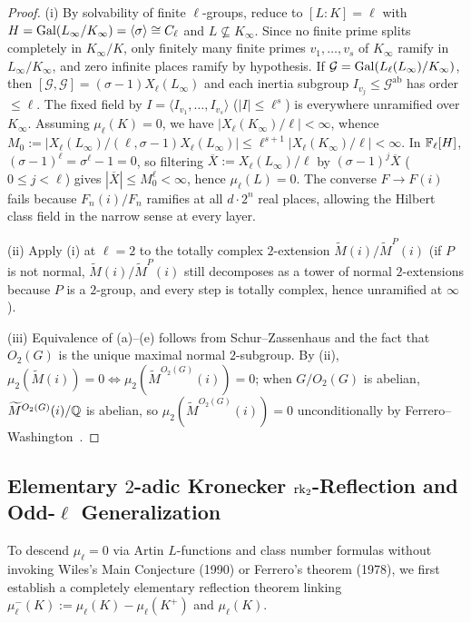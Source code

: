 \begin{proof}
(i) By solvability of finite $\ell$-groups, reduce to $[L:K] = \ell$ with $H = \mathrm{Gal}(L_\infty/K_\infty) = \langle \sigma \rangle \cong C_\ell$ and $L \not\subseteq K_\infty$. Since no finite prime splits completely in $K_\infty/K$, only finitely many finite primes $v_1, \dots, v_s$ of $K_\infty$ ramify in $L_\infty/K_\infty$, and zero infinite places ramify by hypothesis. If $\mathcal{G} = \mathrm{Gal}(L_\ell(L_\infty)/K_\infty)$, then $[\mathcal{G},\mathcal{G}] = (\sigma-1)X_\ell(L_\infty)$ and each inertia subgroup $I_{v_j} \le \mathcal{G}^{\mathrm{ab}}$ has order $\le \ell$. The fixed field by $I = \langle I_{v_1}, \dots, I_{v_s} \rangle$ ($|I| \le \ell^s$) is everywhere unramified over $K_\infty$. Assuming $\mu_\ell(K) = 0$, we have $|X_\ell(K_\infty)/\ell| < \infty$, whence $M_0 := |X_\ell(L_\infty)/(\ell, \sigma-1)X_\ell(L_\infty)| \le \ell^{s+1}|X_\ell(K_\infty)/\ell| < \infty$. In $\mathbb{F}_\ell[H]$, $(\sigma-1)^\ell = \sigma^\ell - 1 = 0$, so filtering $\overline{X} := X_\ell(L_\infty)/\ell$ by $(\sigma-1)^j\overline{X}$ ($0 \le j < \ell$) gives $|\overline{X}| \le M_0^\ell < \infty$, hence $\mu_\ell(L) = 0$. The converse $F \to F(i)$ fails because $F_n(i)/F_n$ ramifies at all $d\cdot 2^n$ real places, allowing the Hilbert class field in the narrow sense at every layer.

(ii) Apply (i) at $\ell = 2$ to the totally complex $2$-extension $\widetilde{M}(i)/\widetilde{M}^P(i)$ (if $P$ is not normal, $\widetilde{M}(i)/\widetilde{M}^P(i)$ still decomposes as a tower of normal $2$-extensions because $P$ is a $2$-group, and every step is totally complex, hence unramified at $\infty$).

(iii) Equivalence of (a)--(e) follows from Schur--Zassenhaus and the fact that $O_2(G)$ is the unique maximal normal $2$-subgroup. By (ii), $\mu_2(\widetilde{M}(i)) = 0 \iff \mu_2(\widetilde{M}^{O_2(G)}(i)) = 0$; when $G/O_2(G)$ is abelian, $\widetilde{M}^{O_2(G)}(i)/\mathbb{Q}$ is abelian, so $\mu_2(\widetilde{M}^{O_2(G)}(i)) = 0$ unconditionally by Ferrero--Washington~\cite{FW1979}.
\end{proof}

\subsection{Elementary $2$-adic Kronecker $\operatorname{rk}_2$-Reflection and Odd-$\ell$ Generalization}\label{sec:3:kronecker}

To descend $\mu_\ell = 0$ via Artin $L$-functions and class number formulas without invoking Wiles's Main Conjecture (1990) or Ferrero's theorem (1978), we first establish a completely elementary reflection theorem linking $\mu_\ell^-(K) := \mu_\ell(K) - \mu_\ell(K^+)$ and $\mu_\ell(K)$.

